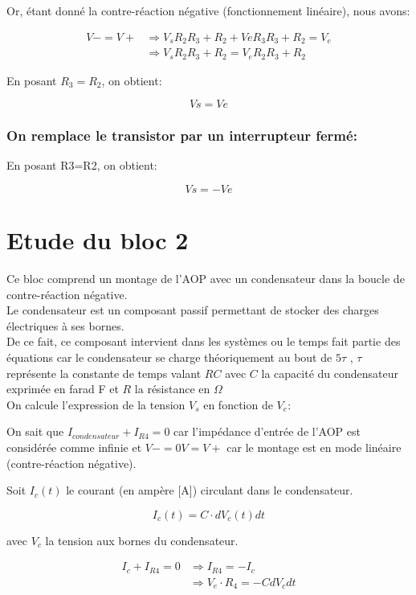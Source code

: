 {Or, étant donné la contre-réaction négative (fonctionnement linéaire), nous avons: 


\begin{align}
     V-=V+     &\Rightarrow V_sR_2R_3+R_2+VeR_3R_3+R_2=V_e\\
               &\Rightarrow V_sR_2R_3+R_2=V_eR_2R_3+R_2
\end{align}

En posant $R_3=R_2$, on obtient:

     $$  Vs=Ve $$


\subsubsection{On remplace le transistor par un interrupteur fermé:}

En posant R3=R2, on obtient:

$$ Vs= -Ve $$


\section{Etude du bloc 2}


Ce bloc comprend un montage de l’AOP avec un condensateur dans la boucle de contre-réaction négative.\\

Le condensateur est un composant passif permettant de stocker des charges électriques à ses bornes.\\
De ce fait, ce composant intervient dans les systèmes ou le temps fait partie des équations car le condensateur se charge théoriquement au bout de $5\tau$ , $\tau$ représente la constante de temps valant $RC$ avec $C$ la capacité du condensateur exprimée en farad F et $R$ la résistance en $\Omega$\\

On calcule l’expression de la tension $V_{s}$ en fonction de $V_e$:

On sait que $I_{condensateur}+I_{R4}=0 $ car l’impédance d’entrée de l’AOP est considérée comme infinie et $V- = 0V = V+$ car le montage est en mode linéaire (contre-réaction négative).

Soit $I_c(t)$ le courant (en ampère [A]) circulant dans le condensateur.


$$I_c(t)=C \cdot dV_c(t)dt $$


avec $V_c$ la tension aux bornes du condensateur.
		
\begin{align}
     I_c+I_{R4}=0        &\Rightarrow I_{R4}= -I_c\\
                         &\Rightarrow V_e \cdot R_4 = -CdV_cdt 
\end{align}

}
